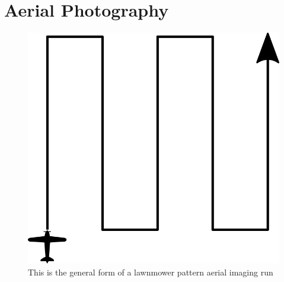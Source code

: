 \section{Aerial Photography}  %
\label{intro:photography}

\begin{figure}[htbp!] 
\centering    
\includegraphics[width=1.0\textwidth]{SimpleLawnmower}
\caption[Simple Lawnmower]{This is the general form of a lawnmower pattern aerial imaging run} %
\label{fig:simplelawnmower}
\end{figure}

